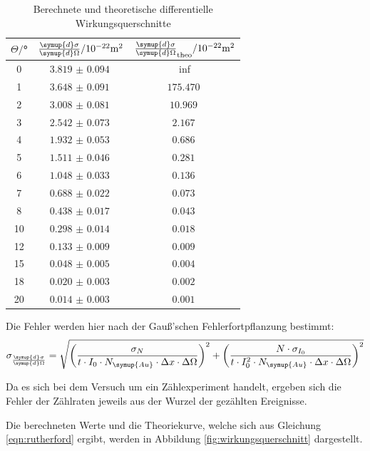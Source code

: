 \begin{table}[H]
  \centering
  \caption{Berechnete und theoretische differentielle Wirkungsquerschnitte}
  \label{tab:Parameter}
  \begin{tabular}{c c c}
    \toprule
    $\Theta/$° & $\frac{\symup{d}\sigma}{\symup{d}\Omega}/ \mathrm{10^{-22}m^2}$ & $\frac{\symup{d}\sigma}{\symup{d}\Omega}_{\mathrm{theo}}/ \mathrm{10^{-22}m^2}$ \\
    \midrule
     0  &  $\SI{3.819(94)}{}$ & inf \\
     1  &  $\SI{3.648(91)}{}$ & $\SI{175.470}{}$ \\
     2  &  $\SI{3.008(81)}{}$ & $\SI{10.969}{}$ \\
     3  &  $\SI{2.542(73)}{}$ & $\SI{2.167}{}$ \\
     4  &  $\SI{1.932(53)}{}$ & $\SI{0.686}{}$ \\
     5  &  $\SI{1.511(46)}{}$ & $\SI{0.281}{}$ \\
     6  &  $\SI{1.048(33)}{}$ & $\SI{0.136}{}$ \\
     7  &  $\SI{0.688(22)}{}$ & $\SI{0.073}{}$\\
     8  &  $\SI{0.438(17)}{}$ & $\SI{0.043}{}$\\
    10  &  $\SI{0.298(14)}{}$ & $\SI{0.018}{}$\\
    12  &  $\SI{0.133(9)}{}$  & $\SI{0.009}{}$\\
    15  &  $\SI{0.048(5)}{}$  & $\SI{0.004}{}$\\
    18  &  $\SI{0.020(3)}{}$  & $\SI{0.002}{}$\\
    20  &  $\SI{0.014(3)}{}$  & $\SI{0.001}{}$\\
      \bottomrule
  \end{tabular}
\end{table}

Die Fehler werden hier nach der Gauß'schen Fehlerfortpflanzung bestimmt:
\begin{equation*}
  \sigma_{\frac{\symup{d}\sigma}{\symup{d}\Omega}} = \sqrt{\left(\frac{\sigma_N}{t \cdot I_0 \cdot N_\symup{Au} \cdot \Delta x \cdot \Delta \Omega}\right)^2
  + \left(\frac{N \cdot \sigma_{I_0}}{t \cdot I_0^2 \cdot N_\symup{Au} \cdot \Delta x \cdot \Delta \Omega}\right)^2}
\end{equation*}

Da es sich bei dem Versuch um ein Zählexperiment handelt, ergeben sich die Fehler der Zählraten jeweils aus der Wurzel der gezählten Ereignisse.

Die berechneten Werte und die Theoriekurve, welche sich aus Gleichung \ref{eqn:rutherford} ergibt, werden in Abbildung \ref{fig:wirkungsquerschnitt} dargestellt.

